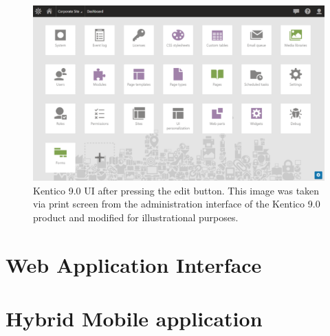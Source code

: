 \begin{figure}[ht!]
  \centering
  \includegraphics[width=\textwidth]{Images/Kentico9EditBtnPressed.png}
  \caption{Kentico 9.0 UI after pressing the edit button. This image was
taken via print screen from the administration interface of the Kentico 9.0 product and modified for illustrational purposes.}
  \label{kentico9UIEditBtnPressed}
\end{figure} 
\section{Web Application Interface} \label{analysisWebAPI}
\section{Hybrid Mobile application} \label{analysisHybridMobileApplication}
